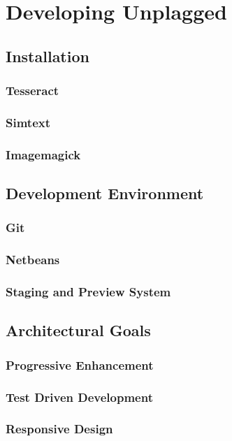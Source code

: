 \chapter{Developing Unplagged}

\section{Installation}
\subsection{Tesseract}
\subsection{Simtext}
\subsection{Imagemagick}

\section{Development Environment}

\subsection{Git}
\subsection{Netbeans}
\subsection{Staging and Preview System}

\section{Architectural Goals}

\subsection{Progressive Enhancement}

\subsection{Test Driven Development}

\subsection{Responsive Design}